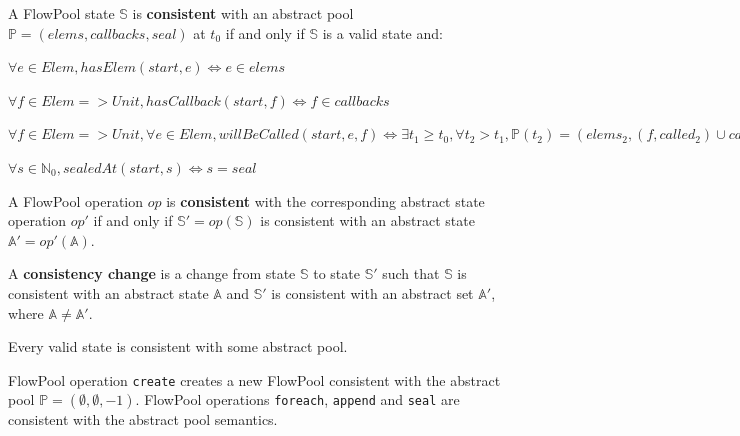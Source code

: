\documentclass[runningheads,a4paper]{llncs}
\begin{document}
\begin{definition}[Consistency]
A FlowPool state $\mathbb{S}$ is \textbf{consistent} with an abstract pool 
$\mathbb{P} = (elems, callbacks, seal)$ at $t_0$ if and only if $\mathbb{S}$ 
is a valid state and:
\begin{description}
\item $\forall e \in Elem, hasElem(start, e) \Leftrightarrow e \in elems$
\item $\forall f \in Elem => Unit, hasCallback(start, f) \Leftrightarrow f \in callbacks$
\item $\forall f \in Elem => Unit, \forall e \in Elem, willBeCalled(start, e, f) \Leftrightarrow \exists t_1 \geq t_0, \forall t_2 > t_1, \mathbb{P}(t_2) = (elems_2, (f, called_2) \cup callbacks_2, seal_2), elems \subseteq called_2$
\item $\forall s \in \mathbb{N}_0, sealedAt(start, s) \Leftrightarrow s = seal$
\end{description}

A FlowPool operation $op$ is \textbf{consistent} with the corresponding 
abstract state operation $op'$ if and only if $\mathbb{S'}=op(\mathbb{S})$ is consistent 
with an abstract state $\mathbb{A'}=op'(\mathbb{A})$.

A \textbf{consistency change} 
is a change from state $\mathbb{S}$ to state $\mathbb{S'}$ such that $\mathbb{S}$ 
is consistent with an abstract state $\mathbb{A}$ and $\mathbb{S'}$ is consistent 
with an abstract set $\mathbb{A'}$, where $\mathbb{A} \neq \mathbb{A'}$.

\end{definition}


\begin{proposition}
Every valid state is consistent with some abstract pool.
\end{proposition}


\begin{theorem}[Safety]
FlowPool operation \verb=create= creates a new FlowPool consistent with the abstract pool 
$\mathbb{P} = (\emptyset, \emptyset, -1)$. FlowPool operations \verb=foreach=, \verb=append= 
and \verb=seal= are consistent with the abstract pool semantics.
\end{theorem}
\end{document}
